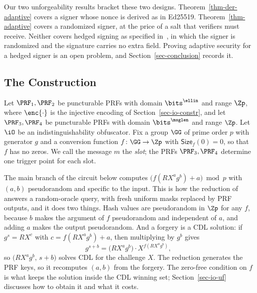 Our two unforgeability results bracket these two designs. Theorem~\ref{thm-der-adaptive} covers a signer whose nonce is derived as in Ed25519. Theorem~\ref{thm-adaptive} covers a randomized signer, at the price of a salt that verifiers must receive. Neither covers hedged signing as specified in~\cite{add:BIP340}, in which the signer is randomized and the signature carries no extra field. Proving adaptive security for a hedged signer is an open problem, and Section~\ref{sec-conclusion} records it.

\subsection{The Construction} \label{sec-derand-constr}

Let $\PRF_1,\PRF_2$ be puncturable PRFs with domain $\bits^{\ellin}$ and range $\Zp$, where $\enc{\cdot}$ is the injective encoding of Section~\ref{sec-io-constr}, and let $\PRF_3,\PRF_4$ be puncturable PRFs with domain $\bits^{\msglen}$ and range $\Zp$. Let $\iO$ be an indistinguishability obfuscator. Fix a group $\GG$ of prime order $p$ with generator $g$ and a conversion function $f\colon\GG\to\Zp$ with $\mathsf{Size}_f(0)=0$, so that $f$ has no zeros. We call the message $m$ the \emph{slot}; the PRFs $\PRF_3,\PRF_4$ determine one trigger point for each slot.

The main branch of the circuit below computes $\big(f(R X^{a} g^{b}) + a\big) \bmod p$ with $(a,b)$ pseudorandom and specific to the input. This is how the reduction of~\cite{C:CFOS25} answers a random-oracle query, with fresh uniform masks replaced by PRF outputs, and it does two things. Hash values are pseudorandom in $\Zp$ for any $f$, because $b$ makes the argument of $f$ pseudorandom and independent of $a$, and adding $a$ makes the output pseudorandom. And a forgery is a CDL solution: if $g^{s}=R X^{c}$ with $c=f(RX^{a}g^{b})+a$, then multiplying by $g^{b}$ gives
$$
g^{s+b}=\big(RX^{a}g^{b}\big)\cdot X^{f(RX^{a}g^{b})} ,
$$
so $\big(RX^{a}g^{b},\,s+b\big)$ solves CDL for the challenge $X$. The reduction generates the PRF keys, so it recomputes $(a,b)$ from the forgery. The zero-free condition on $f$ is what keeps the solution inside the CDL winning set; Section~\ref{sec-io-uf} discusses how to obtain it and what it costs.

